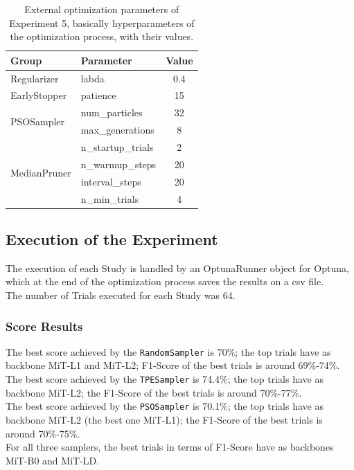 \begin{table}[ht!]
	\center
	\setlength{\tabcolsep}{0.5cm}
	\caption[Optimization External Parameters of Experiment 5]{External optimization parameters of Experiment 5, basically hyperparameters of the optimization process, with their values.}
	\begin{tabular}{@{}llc@{}}
		\toprule
		\textbf{Group}                & \textbf{Parameter} & \textbf{Value} \\ \midrule
		Regularizer                   & labda              & 0.4            \\[0.1cm]
		EarlyStopper                  & patience           & 15             \\[0.2cm]
		\multirow{2}{*}{PSOSampler}   & num\_particles     & 32             \\[0.1cm]
									  & max\_generations   & 8              \\[0.2cm]
		\multirow{4}{*}{MedianPruner} & n\_startup\_trials & 2              \\[0.1cm]
									  & n\_warmup\_steps   & 20             \\[0.1cm]
									  & interval\_steps    & 20             \\[0.1cm]
									  & n\_min\_trials     & 4              \\ \bottomrule
	\end{tabular}
	\label{tab:table-4.5.2}
\end{table}

\subsection{Execution of the Experiment}

The execution of each Study is handled by an OptunaRunner object for Optuna, which at the end of the optimization process saves the results on a csv file.
\\[0.3cm]The number of Trials executed for each Study was 64.

\subsubsection{Score Results}

The best score achieved by the \texttt{RandomSampler} is 70\%; the top trials have as backbone MiT-L1 and MiT-L2; F1-Score of the best trials is around 69\%-74\%.
\\[0.3cm]The best score achieved by the \texttt{TPESampler} is 74.4\%; the top trials have as backbone MiT-L2; the F1-Score of the best trials is around 70\%-77\%.
\\[0.3cm]The best score achieved by the \texttt{PSOSampler} is 70.1\%; the top trials have as backbone MiT-L2 (the best one MiT-L1); the F1-Score of the best trials is around 70\%-75\%.
\\[0.3cm]For all three samplers, the best trials in terms of F1-Score have as backbones MiT-B0 and MiT-LD.

